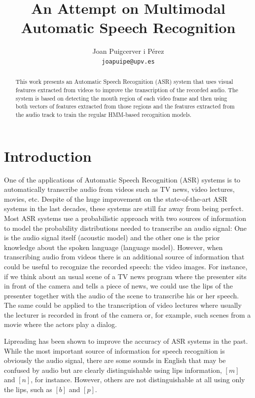 \documentclass[12pt,a4paper]{article}
\author{Joan Puigcerver i Pérez\\
\footnotesize{\texttt{joapuipe@upv.es}}}
\title{An Attempt on Multimodal Automatic Speech Recognition}
\begin{document}
\maketitle
\begin{abstract}
This work presents an Automatic Speech Recognition (ASR) system that uses visual features extracted from videos to improve the transcription of the recorded audio. The system is based on detecting the mouth region of each video frame and then using both vectors of features extracted from those regions and the features extracted from the audio track to train the regular HMM-based recognition models.
\end{abstract}

\section{Introduction}
One of the applications of Automatic Speech Recognition (ASR) systems is to automatically transcribe audio from videos such as TV news, video lectures, movies, etc. Despite of the huge improvement on the state-of-the-art ASR systems in the last decades, these systems are still far away from being perfect. Most ASR systems use a probabilistic approach with two sources of information to model the probability distributions needed to transcribe an audio signal: One is the audio signal itself (acoustic model) and the other one is the prior knowledge about the spoken language (language model). However, when transcribing audio from videos there is an additional source of information that could be useful to recognize the recorded speech: the video images. For instance, if we think about an usual scene of a TV news program where the presenter sits in front of the camera and tells a piece of news, we could use the lips of the presenter together with the audio of the scene to transcribe his or her speech. The same could be applied to the transcription of video lectures where usually the lecturer is recorded in front of the camera or, for example, such scenes from a movie where the actors play a dialog.

Lipreading has been shown to improve the accuracy of ASR systems in the past\cite{neti2000audio, dupont2000audio, hazen2004segment}. While the most important source of information for speech recognition is obviously the audio signal, there are some sounds in English that may be confused by audio but are clearly distinguishable using lips information, $[m]$ and $[n]$, for instance. However, others are not distinguishable at all using only the lips, such as $[b]$ and $[p]$.
\end{document}
